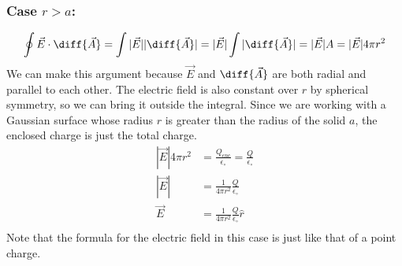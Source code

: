 \documentclass{math}
\begin{document}
\subsubsection*{Case \( r > a \):}
\begin{center}
\end{center}
\[ \oint\vec{E}\cdot\diff{\vec{A}} = \int|\vec{E}||\diff{\vec{A}}| =
  |\vec{E}|\int|\diff{\vec{A}}| = |\vec{E}|A = |\vec{E}|4\pi r^2 \]
We can make this argument because \( \vec{E} \) and \( \diff{\vec{A}} \) are
both radial and parallel to each other. The electric field is also constant
over \( r \) by spherical symmetry, so we can bring it outside the integral.
Since we are working with a Gaussian surface whose radius \( r \) is greater
than the radius of the solid \( a \), the enclosed charge is just the total
charge.
\begin{align*}
  |\vec{E}|4\pi r^2 &= \frac{Q_{enc}}{\epsilon_{\circ}} =
    \frac{Q}{\epsilon_{\circ}} \\
  |\vec{E}| &= \frac{1}{4\pi r^2}\frac{Q}{\epsilon_{\circ}} \\
  \vec{E} &= \frac{1}{4\pi r^2}\frac{Q}{\epsilon_{\circ}}\hat{r} \\
\end{align*}
Note that the formula for the electric field in this case is just like that of
a point charge.
\end{document}
